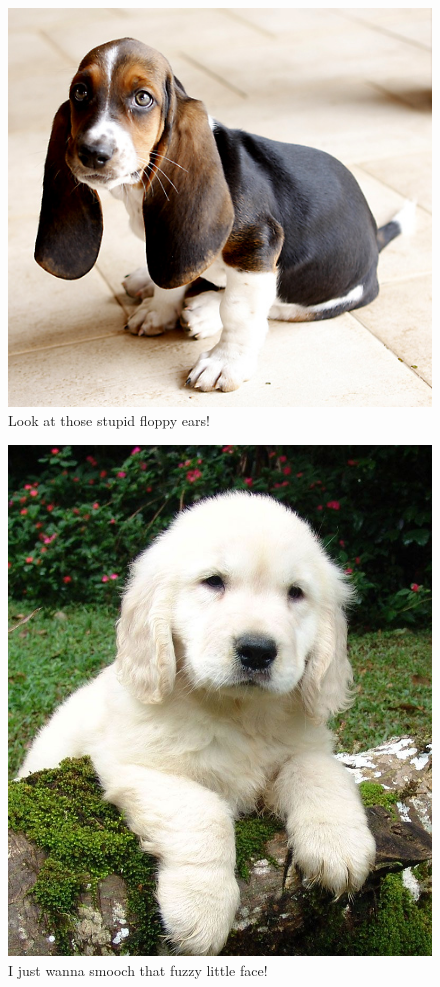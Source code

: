\documentclass[12pt]{extarticle}
\begin{document}
\begin{figure}[!h]
\centering
  \includegraphics[width={0.4\linewidth}]{img/puppy1.jpg}
  \caption{Look at those stupid floppy ears!}
  \label{fig:puppy1}
\end{figure}

\begin{figure}[!h]
\centering
  \includegraphics[width={0.4\linewidth}]{img/puppy2.jpg}
  \caption{I just wanna smooch that fuzzy little face!}
  \label{fig:puppy2}
\end{figure}
\end{document}
